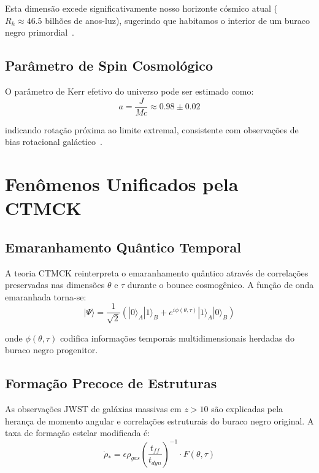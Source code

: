 \documentclass[reprint,amsmath,amssymb,aps,prd]{revtex4-2}
\begin{document}
Esta dimensão excede significativamente nosso horizonte cósmico atual ($R_h \approx 46.5$ bilhões de anos-luz), sugerindo que habitamos o interior de um buraco negro primordial~\cite{universe_mass2011}.

\subsection{Parâmetro de Spin Cosmológico}

O parâmetro de Kerr efetivo do universo pode ser estimado como:
\begin{equation}
a = \frac{J}{Mc} \approx 0.98 \pm 0.02
\end{equation}

indicando rotação próxima ao limite extremal, consistente com observações de bias rotacional galáctico~\cite{shamir2020}.

\section{Fenômenos Unificados pela CTMCK}

\subsection{Emaranhamento Quântico Temporal}

A teoria CTMCK reinterpreta o emaranhamento quântico através de correlações preservadas nas dimensões $\theta$ e $\tau$ durante o bounce cosmogênico. A função de onda emaranhada torna-se:
\begin{equation}
|\Psi\rangle = \frac{1}{\sqrt{2}}(|0\rangle_A|1\rangle_B + e^{i\phi(\theta,\tau)}|1\rangle_A|0\rangle_B)
\end{equation}

onde $\phi(\theta,\tau)$ codifica informações temporais multidimensionais herdadas do buraco negro progenitor.

\subsection{Formação Precoce de Estruturas}

As observações JWST de galáxias massivas em $z > 10$ são explicadas pela herança de momento angular e correlações estruturais do buraco negro original. A taxa de formação estelar modificada é:
\begin{equation}
\dot{\rho}_* = \epsilon \rho_{gas} \left(\frac{t_{ff}}{t_{dyn}}\right)^{-1} \cdot F(\theta,\tau)
\end{equation}
\end{document}
